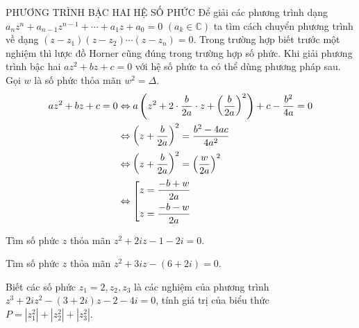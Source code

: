 \begin{dang}{PHƯƠNG TRÌNH BẬC HAI HỆ SỐ PHỨC}
Để giải các phương trình dạng $a_nz^n+a_{n-1}z^{n-1} + \cdots + a_1z+a_0 =0$ $(a_k \in \mathbb{C})$ ta tìm cách chuyển phương trình về dạng $(z-z_1)(z-z_2) \cdots (z-z_n) =0$. Trong trường hợp biết trước một nghiệm thì lược đồ Horner cũng đúng trong trường hợp số phức. Khi giải phương trình bậc hai $az^2+bz+c=0$ với hệ số phức ta có thể dùng phương pháp sau. \\
Gọi $w$ là số phức thỏa mãn $w^2 =\Delta$. 
\begin{align*}
az^2+bz+c=0 &\Leftrightarrow a\left (z^2+2\cdot \dfrac{b}{2a} \cdot z+ \left ( \dfrac{b}{2a}\right )^2 \right )+c- \dfrac{b^2}{4a} =0 \\ & \Leftrightarrow \left (z+\dfrac{b}{2a}\right )^2 = \dfrac{b^2-4ac}{4a^2} \\&\Leftrightarrow \left (z+\dfrac{b}{2a}\right )^2 = \left (\dfrac{w}{2a}\right )^2 \\
& \Leftrightarrow \left[\begin{aligned}&z=\dfrac{-b+w}{2a}\\& z=\dfrac{-b-w}{2a}\end{aligned}\right.
\end{align*}
\end{dang}
\setcounter{vd}{0}
\begin{vd}%
 Tìm số phức $z$ thỏa mãn  $z^2+2iz-1-2i =0$. 
\end{vd}

\begin{vd}%
Tìm số phức $z$ thỏa mãn $z^2 + 3 i z - (6 + 2 i)=0$. 
\end{vd}

\begin{vd}%
 Biết các số phức $z_1=2, z_2,z_3$ là các nghiệm của phương trình $z^3 + 2 i z^2 - (3 + 2 i) z - 2 - 4 i =0$, tính giá trị của biểu thức $P=|z_1^2| +|z_2^2| + |z_3^2|$. 
\end{vd}

